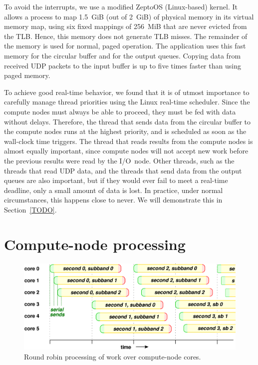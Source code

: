 \documentclass[conference]{IEEEtran}
\begin{document}
To avoid the interrupts, we use a modified ZeptoOS (Linux-based)
kernel\cite{Kazutomo:09}.
It allows a process to map 1.5~GiB (out of 2~GiB) of physical memory in its
virtual memory map, using six fixed mappings of 256~MiB that are never evicted
from the TLB.
Hence, this memory does not generate TLB misses.
The remainder of the memory is used for normal, paged operation.
The application uses this fast memory for the circular buffer and for the
output queues.
Copying data from received UDP packets to the input buffer is up to five times
faster than using paged memory.

To achieve good real-time behavior, we found that it is of utmost importance
to carefully manage thread priorities using the Linux real-time scheduler.
Since the compute nodes must always be able to proceed, they must be fed with
data without delays.
Therefore, the thread that sends data from the circular buffer to the
compute nodes runs at the highest priority, and is scheduled as soon as the
wall-clock time triggers.
The thread that reads results from the compute nodes is almost equally
important, since compute nodes will not accept new work before the previous
results were read by the I/O~node. %
Other threads, such as the threads that read UDP data, and the threads that
send data from the output queues are also important, but if they would ever
fail to meet a real-time deadline, only a small amount of data is lost.
In practice, under normal circumstances, this happens close to never. We will
demonstrate this in Section~\ref{TODO}.





\section{Compute-node processing}

\begin{figure}
\includegraphics[width=\columnwidth]{round-robin.pdf}
\caption{Round robin processing of work over compute-node cores.}
\label{fig:round-robin}
\end{figure}
\end{document}
